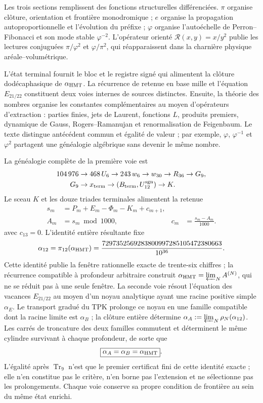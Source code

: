 Les trois sections remplissent des fonctions structurelles différenciées. \(\pi\)
organise clôture, orientation et frontière monodromique ; \(e\) organise la
propagation autoproportionnelle et l'évolution du préfixe ; \(\varphi\) organise
l'autoéchelle de Perron--Fibonacci et son mode stable \(\varphi^{-2}\).
L'opérateur orienté \(\mathscr R(x,y)=x/y^2\) publie les lectures conjuguées
\(\pi/\varphi^2\) et \(\varphi/\pi^2\), qui réapparaissent dans la charnière physique
aréale--volumétrique.

L'état terminal fournit le bloc et le registre signé qui alimentent
la clôture dodécaphasique de \(\alpha_{\rm HMT}\). La récurrence de retenue en
base mille et l'équation \(E_{21/22}\) constituent deux voies internes de
sources distinctes. Ensuite, la théorie des nombres organise les
constantes complémentaires au moyen d'opérateurs d'extraction : parties finies,
jets de Laurent, fonctions \(L\), produits premiers, dynamique de Gauss,
Rogers--Ramanujan et renormalisation de Feigenbaum. Le texte distingue
antécédent commun et égalité de valeur ; par exemple, \(\varphi\),
\(\varphi^{-1}\) et \(\varphi^2\) partagent une généalogie algébrique sans
devenir le même nombre.

La généalogie complète de la première voie est
\[
 \begin{aligned}
 104\,976&\to468\,U_6\to243\,w_6\to w_{30}\to R_{36}\to G_9,\\
 G_9&\to x_{\rm term}\to(B_{\rm term},U_{12}^{\rm sgn})\to K.
 \end{aligned}
\]
Le sceau \(K\) et les douze triades terminales alimentent la retenue
\[
 \begin{aligned}
 s_m&=P_m+E_m-\Phi_m-K_m+c_{m+1},\\
 A_m&=s_m\bmod1000,
 &c_m&=\frac{s_m-A_m}{1000}.
 \end{aligned}
\]
avec \(c_{13}=0\). L'identité entière résultante fixe
\[
 \alpha_{12}=\pi_{12}(\alpha_{\rm HMT})
 =\frac{7297352569283800997285105472380663}{10^{36}}.
\]
Cette identité publie la fenêtre rationnelle exacte de trente-six chiffres ;
la récurrence compatible à profondeur arbitraire construit
\(\alpha_{\rm HMT}=\varprojlim_N A^{(N)}\), qui ne se réduit pas à une seule
fenêtre. La seconde voie résout l'équation des vacances \(E_{21/22}\)
au moyen d'un noyau analytique ayant une racine positive simple \(\alpha_E\). Le
transport gradué du TPK prolonge ce noyau en une famille compatible
dont la racine limite est \(\alpha_B\) ; la clôture entière détermine
\(\alpha_A:=\varprojlim_N\rho_N(\alpha_{12})\). Les carrés de troncature
des deux familles commutent et déterminent le même cylindre survivant à
chaque profondeur, de sorte que
\[
 \boxed{\alpha_A=\alpha_B=\alpha_{\rm HMT}}.
\]
L'égalité après \(\operatorname{Tr}_9\) n'est que le premier certificat
fini de cette identité exacte ; elle n'en constitue pas le critère, n'en borne pas
l'extension et ne sélectionne pas les prolongements. Chaque voie conserve sa propre condition
de frontière au sein du même état enrichi.

